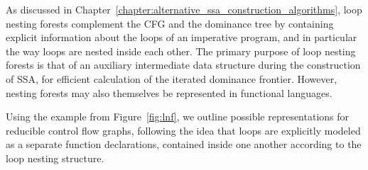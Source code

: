 As discussed in
Chapter~\ref{chapter:alternative_ssa_construction_algorithms}, loop
nesting forests complement the CFG and the dominance tree by
containing explicit information about the loops of an imperative
program, and in particular the way loops are nested inside each other.
The primary purpose of loop nesting forests is that of an auxiliary
intermediate data structure during the construction of SSA, for
efficient calculation of the iterated dominance frontier. However,
nesting forests may also themselves be represented in functional
languages.

Using the example from Figure~\ref{fig:lnf}, we outline possible
representations for reducible control flow graphs, following the idea
that loops are explicitly modeled as a separate function declarations,
contained inside one another according to the loop nesting structure.

